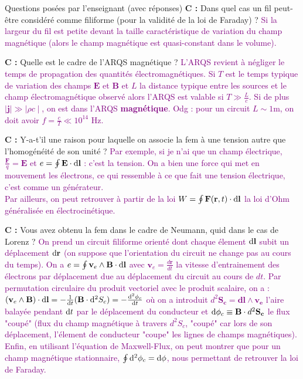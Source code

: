 \begin{reportBlock}{Questions posées par l’enseignant (avec réponses)}
  \textbf{C :} Dans quel cas un fil peut-être considéré comme filiforme (pour la validité de la loi de Faraday) ? \textcolor{purple}{Si la largeur du fil est petite devant la taille caractéristique de variation du champ magnétique (alors le champ magnétique est quasi-constant dans le volume).} \newline
  
  \textbf{C :} Quelle est le cadre de l'ARQS magnétique ? \textcolor{purple}{L'ARQS revient à négliger le temps de propagation des quantités électromagnétiques. Si $T$ est le temps typique de variation des champs $\mathbf{E}$ et $\mathbf{B}$ et $L$ la distance typique entre les sources et le champ électromagnétique observé alors l'ARQS est valable si $T \gg \frac{L}{c}$. Si de plus $\mid \mathbf j \mid \gg \mid \rho c \mid$, on est dans l'ARQS \textbf{magnétique}. Odg : pour un circuit $L \sim 1$m, on doit avoir $f = \frac{c}{T} \ll 10^{14}$ Hz.} \newline
  
  \textbf{C :} Y-a-t'il une raison pour laquelle on associe la fem à une tension autre que l'homogénéité de son unité ? \textcolor{purple}{Par exemple, si je n'ai que un champ électrique, $\frac{\mathbf F}{q} = \mathbf E$ et $e = \oint \mathbf E \cdot \mathrm{d} \mathbf l$ : c'est la tension. On a bien une force qui met en mouvement les électrons, ce qui ressemble à ce que fait une tension électrique, c'est comme un générateur. \\
  Par ailleurs, on peut retrouver à partir de la loi $W = \oint \mathbf{F}(\mathbf{r},t) \cdot \mathrm{d} \mathbf l$ la loi d'Ohm généralisée en électrocinétique.} \newline
  
  \textbf{C :} Vous avez obtenu la fem dans le cadre de Neumann, quid dans le cas de Lorenz ? \textcolor{purple}{On prend un circuit filiforme orienté dont chaque élement $\mathrm{d} \mathbf l$ subit un déplacement $\mathrm{d} \mathbf r$ (on suppose que l'orientation du circuit ne change pas au cours du temps). On a $e = \oint \mathbf{v}_e\land\mathbf{B} \cdot \mathrm{d} \mathbf l$ avec $\mathbf{v}_e = \frac{d\mathbf{r}}{dt}$ la vitesse d'entrainement des électrons par déplacement due au déplacement du circuit au cours de $dt$. Par permutation circulaire du produit vectoriel avec le produit scalaire, on a : $(\mathbf{v}_e\land\mathbf{B}) \cdot \mathrm{d} \mathbf l = - \frac{1}{\mathrm{d} t} (\mathbf{B} \cdot \mathrm{d}^2 S_c) = - \frac{\mathrm{d}^2 \phi_c}{\mathrm{d} t}$ où on a introduit $d^2\mathbf{S_c } = \mathbf{dl}\wedge \mathbf{v_e}$ l'aire balayée pendant $\mathrm{d} t$ par le déplacement du conducteur et $\mathrm{d} \phi_c \equiv \mathbf B \cdot d^2 \mathbf{S_c}$ le flux "coupé" (flux du champ magnétique à travers $d^2 S_c$, "coupé" car lors de son déplacement, l'élement de conducteur "coupe" les lignes de champs magnétiques). Enfin, en utilisant l'équation de Maxwell-Flux, on peut montrer que pour un champ magnétique stationnaire, $\oint \mathrm{d}^2 \phi_c = \mathrm{d} \phi$, nous permettant de retrouver la loi de Faraday.} \newline
  

\end{reportBlock}
